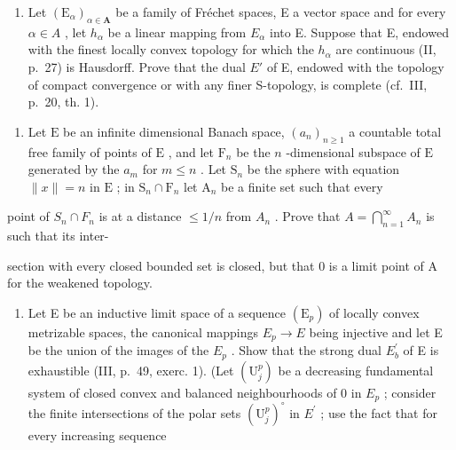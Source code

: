 \begin{enumerate}
\def\labelenumi{\alph{enumi})}
\setcounter{enumi}{1}
\tightlist
\item
  Let \((\mathrm{E}_{\alpha})_{\alpha\in\mathbf{A}}\) be a family of Fréchet spaces, E a vector space and for every \(\alpha\in A\) , let \(h_{\alpha}\) be a linear mapping from \(E_{\alpha}\) into E. Suppose that E, endowed with the finest locally convex topology for which the \(h_{\alpha}\) are continuous (II, p.~27) is Hausdorff. Prove that the dual \(E'\) of E, endowed with the topology of compact convergence or with any finer S-topology, is complete (cf.~III, p.~20, th. 1).
\end{enumerate}

\begin{enumerate}
\def\labelenumi{\arabic{enumi})}
\setcounter{enumi}{14}
\tightlist
\item
  Let \(\mathrm{E}\) be an infinite dimensional Banach space, \((a_{n})_{n\geqslant 1}\) a countable total free family of points of \(\mathrm{E}\) , and let \(\mathrm{F}_n\) be the \(n\) -dimensional subspace of \(\mathrm{E}\) generated by the \(a_{m}\) for \(m\leqslant n\) . Let \(\mathrm{S}_n\) be the sphere with equation \(\| x\| = n\) in \(\mathrm{E}\) ; in \(\mathrm{S}_n\cap \mathrm{F}_n\) let \(\mathrm{A}_n\) be a finite set such that every
\end{enumerate}

point of \(S_{n} \cap F_{n}\) is at a distance \(\leqslant 1/n\) from \(A_{n}\) . Prove that \(A = \bigcap_{n=1}^{\infty} A_{n}\) is such that its inter-

section with every closed bounded set is closed, but that 0 is a limit point of A for the weakened topology.

\begin{enumerate}
\def\labelenumi{\arabic{enumi})}
\setcounter{enumi}{15}
\tightlist
\item
  Let E be an inductive limit space of a sequence \((\mathrm{E}_{p})\) of locally convex metrizable spaces, the canonical mappings \(E_{p} \rightarrow E\) being injective and let E be the union of the images of the \(E_{p}\) . Show that the strong dual \(E_{b}^{\prime}\) of E is exhaustible (III, p.~49, exerc. 1). (Let \((\mathrm{U}_{j}^{p})\) be a decreasing fundamental system of closed convex and balanced neighbourhoods of 0 in \(E_{p}\) ; consider the finite intersections of the polar sets \((\mathrm{U}_{j}^{p})^{\circ}\) in \(E^{\prime}\) ; use the fact that for every increasing sequence
\end{enumerate}

